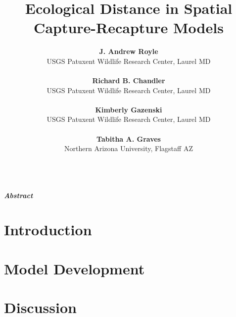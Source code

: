 \documentclass[12pt]{article}
\title{Ecological Distance in Spatial Capture-Recapture Models}
\author{
{\bf J. Andrew Royle}\\ 
USGS Patuxent Wildlife Research Center, Laurel MD \\ \\
{\bf Richard B. Chandler} \\ 
USGS Patuxent Wildlife Research Center, Laurel MD\\ \\
{\bf Kimberly Gazenski} \\
USGS Patuxent Wildlife Research Center, Laurel MD\\ \\
{\bf Tabitha A. Graves} \\
Northern Arizona University, Flagstaff AZ \\ \\
}
\begin{document}

\maketitle

\date

\newpage

\linenumbers

\begin{flushleft}
{\em \bf Abstract}


\end{flushleft}

\section{Introduction}

      

\section{Model Development}





\section{Discussion}


 



\newpage



\newpage




\end{document}
